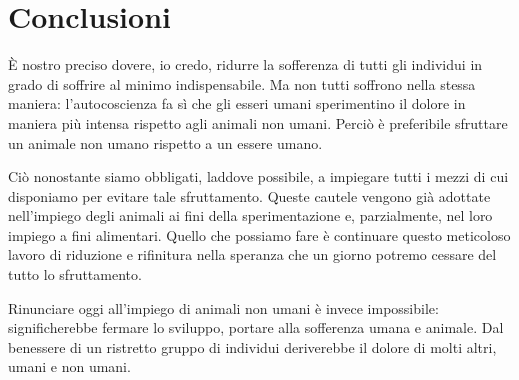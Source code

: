 \chapter{Conclusioni}
\label{ch:conclusioni}

È nostro preciso dovere, io credo, ridurre la sofferenza di tutti gli individui in grado di soffrire
al minimo indispensabile. Ma non tutti soffrono nella stessa maniera: l'autocoscienza fa sì che gli
esseri umani sperimentino il dolore in maniera più intensa rispetto agli animali non umani. Perciò è
preferibile sfruttare un animale non umano rispetto a un essere umano.

Ciò nonostante siamo obbligati, laddove possibile, a impiegare tutti i mezzi di cui disponiamo per
evitare tale sfruttamento. Queste cautele vengono già adottate nell'impiego degli animali ai fini
della sperimentazione e, parzialmente, nel loro impiego a fini alimentari. Quello che possiamo fare
è continuare questo meticoloso lavoro di riduzione e rifinitura nella speranza che un giorno potremo
cessare del tutto lo sfruttamento.

Rinunciare oggi all'impiego di animali non umani è invece impossibile: significherebbe fermare lo
sviluppo, portare alla sofferenza umana e animale. Dal benessere di un ristretto gruppo di individui
deriverebbe il dolore di molti altri, umani e non umani.
